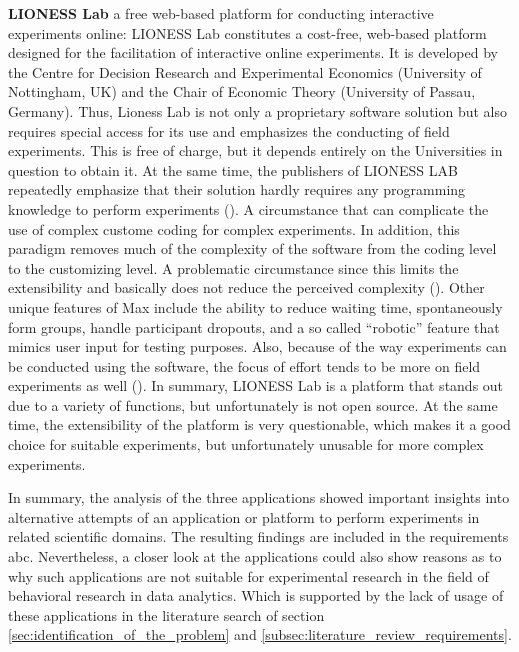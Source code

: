 \textbf{LIONESS Lab} a free web-based platform for conducting interactive experiments online:
LIONESS Lab constitutes a cost-free, web-based platform designed for the facilitation of interactive online experiments. It is developed by the Centre for Decision Research and Experimental Economics (University of Nottingham, UK) and the Chair of Economic Theory (University of Passau, Germany). Thus, Lioness Lab is not only a proprietary software solution but also requires special access for its use and emphasizes the conducting of field experiments. This is free of charge, but it depends entirely on the Universities in question to obtain it. At the same time, the publishers of LIONESS LAB repeatedly emphasize that their solution hardly requires any programming knowledge to perform experiments (\cite{Giamattei.2020}). A circumstance that can complicate the use of complex custome coding for complex experiments. In addition, this paradigm removes much of the complexity of the software from the coding level to the customizing level. A problematic circumstance since this limits the extensibility and basically does not reduce the perceived complexity (\cite{Chou.2008}). Other unique features of Max include the ability to reduce waiting time, spontaneously form groups, handle participant dropouts, and a so called \enquote{robotic} feature that mimics user input for testing purposes. Also, because of the way experiments can be conducted using the software, the focus of effort tends to be more on field experiments as well (\cite{Giamattei.2020}). In summary, LIONESS Lab is a platform that stands out due to a variety of functions, but unfortunately is not open source. At the same time, the extensibility of the platform is very questionable, which makes it a good choice for suitable experiments, but unfortunately unusable for more complex experiments.




In summary, the analysis of the three applications showed important insights into alternative attempts of an application or platform to perform experiments in related scientific domains. The resulting findings are included in the requirements abc. Nevertheless, a closer look at the applications could also show reasons as to why such applications are not suitable for experimental research in the field of behavioral research in data analytics. Which is supported by the lack of usage of these applications in the literature search of section \ref{sec:identification_of_the_problem} and \ref{subsec:literature_review_requirements}.

